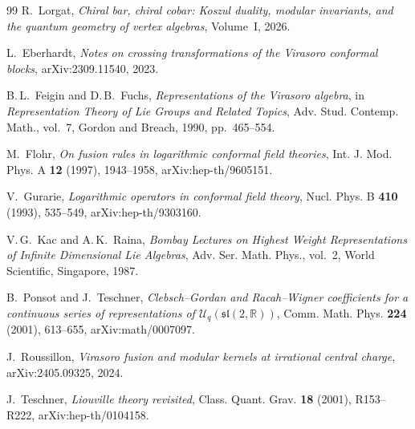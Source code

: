 \documentclass[11pt]{amsart}
\theoremstyle{definition}
\theoremstyle{remark}
\begin{document}
\begin{thebibliography}{99}
R.~Lorgat, \emph{Chiral bar, chiral cobar: Koszul duality, modular
invariants, and the quantum geometry of vertex algebras}, Volume~I,
2026.

L.~Eberhardt, \emph{Notes on crossing transformations of the Virasoro
conformal blocks}, arXiv:2309.11540, 2023.

B.\,L.~Feigin and D.\,B.~Fuchs, \emph{Representations of the Virasoro
algebra}, in \emph{Representation Theory of Lie Groups and Related
Topics}, Adv. Stud. Contemp. Math., vol.~7, Gordon and Breach, 1990,
pp.~465--554.

M.~Flohr, \emph{On fusion rules in logarithmic conformal field
theories}, Int. J. Mod. Phys. A \textbf{12} (1997), 1943--1958,
arXiv:hep-th/9605151.

V.~Gurarie, \emph{Logarithmic operators in conformal field theory},
Nucl. Phys. B \textbf{410} (1993), 535--549, arXiv:hep-th/9303160.

V.\,G.~Kac and A.\,K.~Raina, \emph{Bombay Lectures on Highest Weight
Representations of Infinite Dimensional Lie Algebras}, Adv. Ser. Math.
Phys., vol.~2, World Scientific, Singapore, 1987.

B.~Ponsot and J.~Teschner, \emph{Clebsch--Gordan and Racah--Wigner
coefficients for a continuous series of representations of
$\mathcal{U}_q(\mathfrak{sl}(2,\mathbb{R}))$}, Comm. Math. Phys.
\textbf{224} (2001), 613--655, arXiv:math/0007097.

J.~Roussillon, \emph{Virasoro fusion and modular kernels at irrational
central charge}, arXiv:2405.09325, 2024.

J.~Teschner, \emph{Liouville theory revisited}, Class. Quant. Grav.
\textbf{18} (2001), R153--R222, arXiv:hep-th/0104158.
\end{thebibliography}
\end{document}
